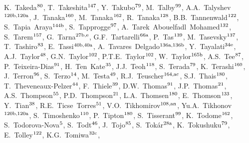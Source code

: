 \begin{flushleft}
K.~Takeda$^\textrm{\scriptsize 80}$,    
T.~Takeshita$^\textrm{\scriptsize 147}$,    
Y.~Takubo$^\textrm{\scriptsize 79}$,    
M.~Talby$^\textrm{\scriptsize 99}$,    
A.A.~Talyshev$^\textrm{\scriptsize 120b,120a}$,    
J.~Tanaka$^\textrm{\scriptsize 160}$,    
M.~Tanaka$^\textrm{\scriptsize 162}$,    
R.~Tanaka$^\textrm{\scriptsize 128}$,    
B.B.~Tannenwald$^\textrm{\scriptsize 122}$,    
S.~Tapia~Araya$^\textrm{\scriptsize 144b}$,    
S.~Tapprogge$^\textrm{\scriptsize 97}$,    
A.~Tarek~Abouelfadl~Mohamed$^\textrm{\scriptsize 132}$,    
S.~Tarem$^\textrm{\scriptsize 157}$,    
G.~Tarna$^\textrm{\scriptsize 27b,e}$,    
G.F.~Tartarelli$^\textrm{\scriptsize 66a}$,    
P.~Tas$^\textrm{\scriptsize 139}$,    
M.~Tasevsky$^\textrm{\scriptsize 137}$,    
T.~Tashiro$^\textrm{\scriptsize 83}$,    
E.~Tassi$^\textrm{\scriptsize 40b,40a}$,    
A.~Tavares~Delgado$^\textrm{\scriptsize 136a,136b}$,    
Y.~Tayalati$^\textrm{\scriptsize 34e}$,    
A.J.~Taylor$^\textrm{\scriptsize 48}$,    
G.N.~Taylor$^\textrm{\scriptsize 102}$,    
P.T.E.~Taylor$^\textrm{\scriptsize 102}$,    
W.~Taylor$^\textrm{\scriptsize 165b}$,    
A.S.~Tee$^\textrm{\scriptsize 87}$,    
P.~Teixeira-Dias$^\textrm{\scriptsize 91}$,    
H.~Ten~Kate$^\textrm{\scriptsize 35}$,    
J.J.~Teoh$^\textrm{\scriptsize 118}$,    
S.~Terada$^\textrm{\scriptsize 79}$,    
K.~Terashi$^\textrm{\scriptsize 160}$,    
J.~Terron$^\textrm{\scriptsize 96}$,    
S.~Terzo$^\textrm{\scriptsize 14}$,    
M.~Testa$^\textrm{\scriptsize 49}$,    
R.J.~Teuscher$^\textrm{\scriptsize 164,ac}$,    
S.J.~Thais$^\textrm{\scriptsize 180}$,    
T.~Theveneaux-Pelzer$^\textrm{\scriptsize 44}$,    
F.~Thiele$^\textrm{\scriptsize 39}$,    
D.W.~Thomas$^\textrm{\scriptsize 91}$,    
J.P.~Thomas$^\textrm{\scriptsize 21}$,    
A.S.~Thompson$^\textrm{\scriptsize 55}$,    
P.D.~Thompson$^\textrm{\scriptsize 21}$,    
L.A.~Thomsen$^\textrm{\scriptsize 180}$,    
E.~Thomson$^\textrm{\scriptsize 133}$,    
Y.~Tian$^\textrm{\scriptsize 38}$,    
R.E.~Ticse~Torres$^\textrm{\scriptsize 51}$,    
V.O.~Tikhomirov$^\textrm{\scriptsize 108,an}$,    
Yu.A.~Tikhonov$^\textrm{\scriptsize 120b,120a}$,    
S.~Timoshenko$^\textrm{\scriptsize 110}$,    
P.~Tipton$^\textrm{\scriptsize 180}$,    
S.~Tisserant$^\textrm{\scriptsize 99}$,    
K.~Todome$^\textrm{\scriptsize 162}$,    
S.~Todorova-Nova$^\textrm{\scriptsize 5}$,    
S.~Todt$^\textrm{\scriptsize 46}$,    
J.~Tojo$^\textrm{\scriptsize 85}$,    
S.~Tok\'ar$^\textrm{\scriptsize 28a}$,    
K.~Tokushuku$^\textrm{\scriptsize 79}$,    
E.~Tolley$^\textrm{\scriptsize 122}$,    
K.G.~Tomiwa$^\textrm{\scriptsize 32c}$,    

\end{flushleft}
